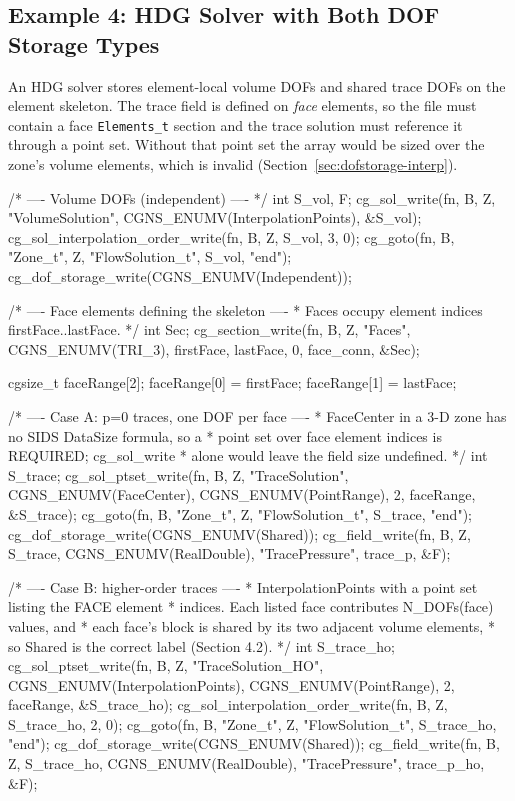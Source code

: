 \documentclass[11pt,letterpaper]{article}
\makeatletter
\let\cgns@orig@lstlisting\lstlisting
\let\cgns@endorig@lstlisting\endlstlisting
\renewenvironment{lstlisting}
  {\par\needspace{5\baselineskip}\nolinenumbers\cgns@orig@lstlisting}
  {\cgns@endorig@lstlisting\par\linenumbers}
\makeatother
\begin{document}
\subsection{Example 4: HDG Solver with Both DOF Storage Types}
\label{ex:hdg}

An HDG solver stores element-local volume DOFs and shared trace DOFs
on the element skeleton.  The trace field is defined on \emph{face}
elements, so the file must contain a face \texttt{Elements\_t} section
and the trace solution must reference it through a point set.  Without
that point set the array would be sized over the zone's volume
elements, which is invalid
(Section~\ref{sec:dofstorage-interp}).

\begin{lstlisting}[language=C]
/* ---- Volume DOFs (independent) ---- */
int S_vol, F;
cg_sol_write(fn, B, Z, "VolumeSolution",
    CGNS_ENUMV(InterpolationPoints), &S_vol);
cg_sol_interpolation_order_write(fn, B, Z, S_vol, 3, 0);
cg_goto(fn, B, "Zone_t", Z, "FlowSolution_t", S_vol, "end");
cg_dof_storage_write(CGNS_ENUMV(Independent));

/* ---- Face elements defining the skeleton ----
 * Faces occupy element indices firstFace..lastFace. */
int Sec;
cg_section_write(fn, B, Z, "Faces", CGNS_ENUMV(TRI_3),
    firstFace, lastFace, 0, face_conn, &Sec);

cgsize_t faceRange[2];
faceRange[0] = firstFace;
faceRange[1] = lastFace;

/* ---- Case A: p=0 traces, one DOF per face ----
 * FaceCenter in a 3-D zone has no SIDS DataSize formula, so a
 * point set over face element indices is REQUIRED; cg_sol_write
 * alone would leave the field size undefined. */
int S_trace;
cg_sol_ptset_write(fn, B, Z, "TraceSolution",
    CGNS_ENUMV(FaceCenter), CGNS_ENUMV(PointRange),
    2, faceRange, &S_trace);
cg_goto(fn, B, "Zone_t", Z, "FlowSolution_t", S_trace, "end");
cg_dof_storage_write(CGNS_ENUMV(Shared));
cg_field_write(fn, B, Z, S_trace, CGNS_ENUMV(RealDouble),
    "TracePressure", trace_p, &F);

/* ---- Case B: higher-order traces ----
 * InterpolationPoints with a point set listing the FACE element
 * indices.  Each listed face contributes N_DOFs(face) values, and
 * each face's block is shared by its two adjacent volume elements,
 * so Shared is the correct label (Section 4.2). */
int S_trace_ho;
cg_sol_ptset_write(fn, B, Z, "TraceSolution_HO",
    CGNS_ENUMV(InterpolationPoints), CGNS_ENUMV(PointRange),
    2, faceRange, &S_trace_ho);
cg_sol_interpolation_order_write(fn, B, Z, S_trace_ho, 2, 0);
cg_goto(fn, B, "Zone_t", Z, "FlowSolution_t", S_trace_ho, "end");
cg_dof_storage_write(CGNS_ENUMV(Shared));
cg_field_write(fn, B, Z, S_trace_ho, CGNS_ENUMV(RealDouble),
    "TracePressure", trace_p_ho, &F);
\end{lstlisting}
\end{document}
